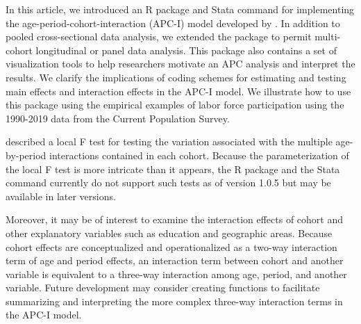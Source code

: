 In this article, we introduced an R package  and Stata command  for implementing the age-period-cohort-interaction (APC-I) model developed by \citet{luo_age-period-cohort-interaction_2020}. In addition to pooled cross-sectional data analysis, we extended the package to permit multi-cohort longitudinal or panel data analysis. This package also contains a set of visualization tools to help researchers motivate an APC analysis and interpret the results. We clarify the implications of coding schemes for estimating and testing main effects and interaction effects in the APC-I model. We illustrate how to use this package using the empirical examples of labor force participation using the 1990-2019 data from the Current Population Survey. 

\citet{luo_age-period-cohort-interaction_2020} described a local F test for testing the variation associated with the multiple age-by-period interactions contained in each cohort. Because the parameterization of the local F test is more intricate than it appears, the R package  and the Stata command  currently do not support such tests as of version 1.0.5 but may be available in later versions. 


Moreover, it may be of interest to examine the interaction effects of cohort and other explanatory variables such as education and geographic areas.  Because cohort effects are conceptualized and operationalized as a two-way interaction term of age and period effects, an interaction term between cohort and another variable is equivalent to a three-way interaction among age, period, and another variable. Future development may consider creating functions to facilitate summarizing and interpreting the more complex three-way interaction terms in the APC-I model.




\address{Jiahui Xu\\
  The Pennsylvania State University\\
  917 Oswald Tower
  University Park, PA 16802\\
  United States\\
  ORCiD: 0000-0003-2728-0674 \\
  }

\address{Liying Luo\\
  The Pennsylvania State University\\
  202 Oswald Tower
  University Park, PA 16802\\
  United States\\
  (ORCiD: 0000-0001-5393-6695) \\
  }
